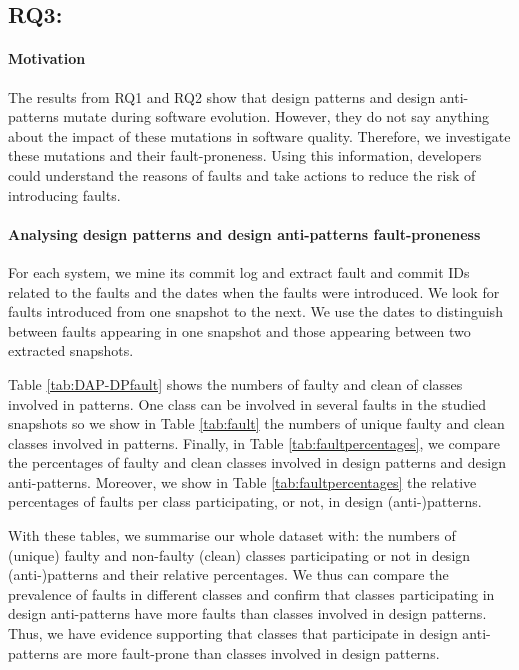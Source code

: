 \subsection{\textbf{RQ3:} \textit{\RQThree}}

\paragraph{\textbf{Motivation}} The results from RQ1 and RQ2 show that design patterns and design anti-patterns mutate during software evolution. However, they do not say anything about the impact of these mutations in software quality. Therefore, we investigate these mutations and their fault-proneness. Using this information, developers could understand the reasons of faults and take actions to reduce the risk of introducing faults.

\paragraph{\textbf{Analysing design patterns and design anti-patterns fault-proneness}} For each system, we mine its commit log and extract fault and commit IDs related to the faults and the dates when the faults were introduced. We look for faults introduced from one snapshot to the next. We use the dates to distinguish between faults appearing in one snapshot and those appearing between two extracted snapshots.

Table \ref{tab:DAP-DPfault} shows the numbers of faulty and clean of classes involved in patterns. One class can be involved in several faults in the studied snapshots so we show in Table \ref{tab:fault} the numbers of unique faulty and clean classes involved in patterns. Finally, in Table \ref{tab:faultpercentages}, we compare the percentages of faulty and clean classes involved in design patterns and design anti-patterns. Moreover, we show in Table \ref{tab:faultpercentages} the relative percentages of faults per class participating, or not, in design (anti-)patterns. 

With these tables, we summarise our whole dataset with: the numbers of (unique) faulty and non-faulty (clean) classes participating or not in design (anti-)patterns and their relative percentages. We thus can compare the prevalence of faults in different classes and confirm that classes participating in design anti-patterns have more faults than classes involved in design patterns. Thus, we have evidence supporting that classes that participate in design anti-patterns are more fault-prone than classes involved in design patterns.

